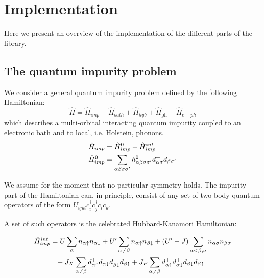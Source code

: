 \documentclass[edipack2.tex]{subfiles}
\begin{document}
\section{Implementation}\label{SecEDIpack}
Here we present an overview of the implementation of the
different parts of the \NAME library. 

\subsection{The quantum impurity problem}\label{sSecQIM}
We consider a general quantum impurity problem defined by the
following Hamiltonian:
$$
\hat{H} = \hat{H}_{imp} + \hat{H}_{bath} + \hat{H}_{hyb} + \hat{H}_\mathrm{ph} + \hat{H}_{e-ph}
$$
which describes a  multi-orbital interacting quantum
impurity coupled to an electronic bath and to local, i.e. Holstein,
phonons. 
\begin{equation}\label{Himp}
  \begin{split}
    \hat{H}_{imp} & = \hat{H}^0_{imp} + \hat{H}^{int}_{imp}\\
    \hat{H}^0_{imp} & =
    \sum_{\alpha\beta\sigma\sigma'}h^{0}_{\alpha\beta\sigma\sigma'}d^{+}_{\alpha\sigma}d_{\beta\sigma'}\\
\end{split}
\end{equation}

We assume for the moment that no particular symmetry
holds. The impurity part of the Hamiltonian can, in principle, consist of any set of
two-body quantum operators of the form $U_{ijkl}c^{\dagger}_{i}c^{\dagger}_{j}c_{l}c_{k}$.

A set of such operators is the celebrated Hubbard-Kanamori Hamiltonian: 

\begin{equation}\label{Hint}
  \begin{split}
    \hat{H}^{int}_{imp} &=U\sum_{\a}n_{\a\uparrow}n_{\a\downarrow}+U'\sum_{\a\neq \b}n_{\a\uparrow}n_{\b\downarrow}+(U'-J)\sum_{\a<\b,\sigma}n_{\a\sigma}n_{\b\sigma}\\
    &{\phantom =}- J_X\sum_{\a\neq
      \b}d^{+}_{\a\uparrow}d_{\a\downarrow}d^{+}_{\b\downarrow}d_{\b\uparrow}+J_P\sum_{\a
      \neq
      \b}d^{+}_{\a\uparrow}d^{+}_{\a\downarrow}d_{\b\downarrow}d_{\b\uparrow}\\
\end{split}
\end{equation}
\end{document}
